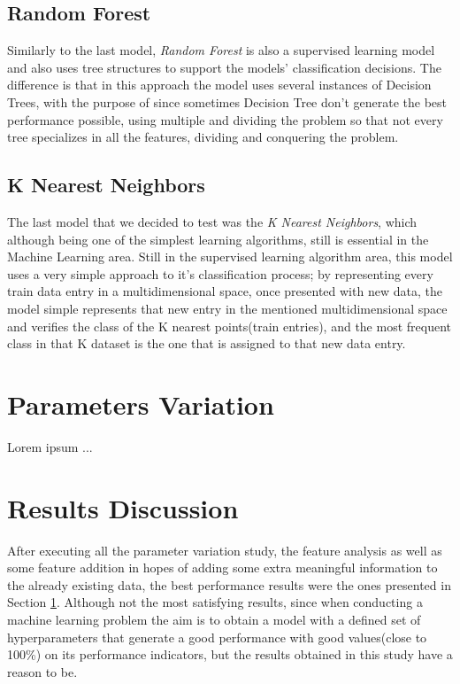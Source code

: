 \documentclass[conference]{IEEEtran}
\begin{document}
\subsection{Random Forest}
Similarly to the last model, \textit{Random Forest} is also a supervised learning model and also uses tree structures to support the models' classification decisions. The difference is that in this approach the model uses several instances of Decision Trees, with the purpose of since sometimes Decision Tree don't generate the best performance possible, using multiple and dividing the problem so that not every tree specializes in all the features, dividing and conquering the problem.

\subsection{K Nearest Neighbors}
The last model that we decided to test was the \textit{K Nearest Neighbors}, which although being one of the simplest learning algorithms, still is essential in the Machine Learning area. Still in the supervised learning algorithm area, this model uses a very simple approach to it's classification process; by representing every train data entry in a multidimensional space, once presented with new data, the model simple represents that new entry in the mentioned multidimensional space and verifies the class of the K nearest points(train entries), and the most frequent class in that K dataset is the one that is assigned to that new data entry. 

\section{Parameters Variation}\label{parameters}

Lorem ipsum ...

\section{Results Discussion}
After executing all the parameter variation study, the feature analysis as well as some feature addition in hopes of adding some extra meaningful information to the already existing data, the best performance results were the ones presented in Section \ref{parameters}.
Although not the most satisfying results, since when conducting a machine learning problem the aim is to obtain a model with a defined set of hyperparameters that generate a good performance with good values(close to 100\%) on its performance indicators, but the results obtained in this study have a reason to be.
\end{document}
